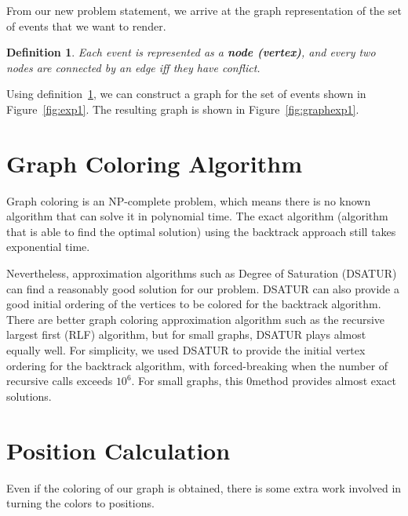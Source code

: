 \documentclass[12pt]{article}
\newtheorem{definition}{Definition}
\begin{document}
From our new problem statement, we arrive at the graph representation of the set of events that we want to render.

\begin{definition}\label{def:3}
    Each event is represented as a \textbf{node (vertex)}, and every two nodes are connected by an edge iff they have conflict.
\end{definition}

Using definition~\ref{def:3}, we can construct a graph for the set of events shown in Figure~\ref{fig:exp1}. The resulting graph is shown in Figure~\ref{fig:graphexp1}.

\section{Graph Coloring Algorithm}
Graph coloring is an NP-complete problem, which means there is no known algorithm that can solve it in polynomial time. The exact algorithm (algorithm that is able to find the optimal solution) using the backtrack approach still takes exponential time. 

Nevertheless, approximation algorithms such as Degree of Saturation (DSATUR) can find a reasonably good solution for our problem. DSATUR can also provide a good initial ordering of the vertices to be colored for the backtrack algorithm. There are better graph coloring approximation algorithm such as the recursive largest first (RLF) algorithm, but for small graphs, DSATUR plays almost equally well. For simplicity, we used DSATUR to provide the initial vertex ordering for the backtrack algorithm, with forced-breaking when the number of recursive calls exceeds $10^6$. For small graphs, this 0method provides almost exact solutions.

\section{Position Calculation}
Even if the coloring of our graph is obtained, there is some extra work involved in turning the colors to positions.
\end{document}
